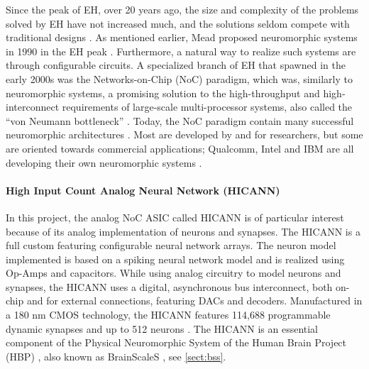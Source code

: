 Since the peak of EH, over 20 years ago, the size and complexity of the problems solved by EH have not increased much, and the solutions seldom compete with traditional designs \cite{haddow_challenges_2011}.
As mentioned earlier, Mead proposed neuromorphic systems in 1990 in the EH peak \cite{mead_neuromorphic_1990}.
Furthermore, a natural way to realize such systems are through configurable circuits.
A specialized branch of EH that spawned in the early 2000s was the Networks-on-Chip (NoC) paradigm,
which was, similarly to neuromorphic systems, a promising solution to the high-throughput and high-interconnect requirements of large-scale multi-processor systems, also called the  ``von Neumann bottleneck'' \cite{benini_networks_2002}\cite{trefzer_evolvable_2015}\cite{mead_neuromorphic_1990}.
Today, the NoC paradigm contain many successful neuromorphic architectures \cite{trefzer_evolvable_2015}.
Most are developed by and for researchers, but some are oriented towards commercial applications;
Qualcomm, Intel and IBM are all developing their own neuromorphic systems \cite{meier_mixed-signal_2015}\cite{davies_loihi_2018}\cite{debole_truenorth_2019}\cite{trefzer_evolvable_2015}.

\paragraph{High Input Count Analog Neural Network (HICANN)} \label{sect:hicann}
In this project, the analog NoC ASIC called HICANN is of particular interest\cite{schemmel_wafer-scale_2008} because of its analog implementation of neurons and synapses.
 The HICANN is a full custom featuring configurable neural network arrays.
The neuron model implemented is based on a spiking neural network model and is realized using Op-Amps and capacitors.
While using analog circuitry to model neurons and synapses, the HICANN uses a digital, asynchronous bus interconnect, both on-chip and for external connections, featuring DACs and decoders.
Manufactured in a 180 nm CMOS technology, the HICANN features 114,688 programmable dynamic synapses and up to 512 neurons \cite{zoschke_full_2017}.
\cite{haddow_challenges_2011}\cite{trefzer_evolvable_2015}
The HICANN is an essential component of the Physical Neuromorphic System of the Human Brain Project (HBP) \cite{markram_introducing_2011}, also known as BrainScaleS \cite{meier_mixed-signal_2015}, see \vref{sect:bss}.


















